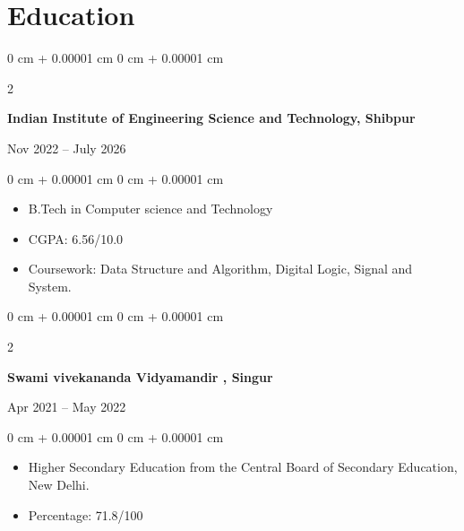 \documentclass[10pt, letterpaper]{article}
\newenvironment{highlights}{
    \begin{itemize}[
        topsep=0.10 cm,
        parsep=0.10 cm,
        partopsep=0pt,
        itemsep=0pt,
        leftmargin=0 cm + 10pt
    ]
}{
    \end{itemize}
} %
\newenvironment{highlightsforbulletentries}{
    \begin{itemize}[
        topsep=0.10 cm,
        parsep=0.10 cm,
        partopsep=0pt,
        itemsep=0pt,
        leftmargin=10pt
    ]
}{
    \end{itemize}
} %
\newenvironment{onecolentry}{
    \begin{adjustwidth}{
        0 cm + 0.00001 cm
    }{
        0 cm + 0.00001 cm
    }
}{
    \end{adjustwidth}
} %
\newenvironment{twocolentry}[2][]{
    \onecolentry
    \def\secondColumn{#2}
    \setcolumnwidth{\fill, 4.5 cm}
    \begin{paracol}{2}
}{
    \switchcolumn \raggedleft \secondColumn
    \end{paracol}
    \endonecolentry
} %
\begin{document}








\section{Education}

\begin{twocolentry}{Nov 2022 – July 2026}
    \textbf{Indian Institute of Engineering Science and Technology, Shibpur}
\end{twocolentry}

\vspace{0.10 cm}
\begin{onecolentry}
    \begin{highlights}
        \item B.Tech in Computer science and Technology
        \item CGPA: 6.56/10.0
        \item Coursework: Data Structure and Algorithm, Digital Logic, Signal and System.
    \end{highlights}
\end{onecolentry}

\begin{twocolentry}{Apr 2021 – May 2022}
    \textbf{Swami vivekananda Vidyamandir , Singur}
\end{twocolentry}

\vspace{0.10 cm}
\begin{onecolentry}
    \begin{highlights}
        \item Higher Secondary Education from the Central Board of Secondary Education, New Delhi.
        \item Percentage: 71.8/100
    \end{highlights}
\end{onecolentry}
\end{document}
